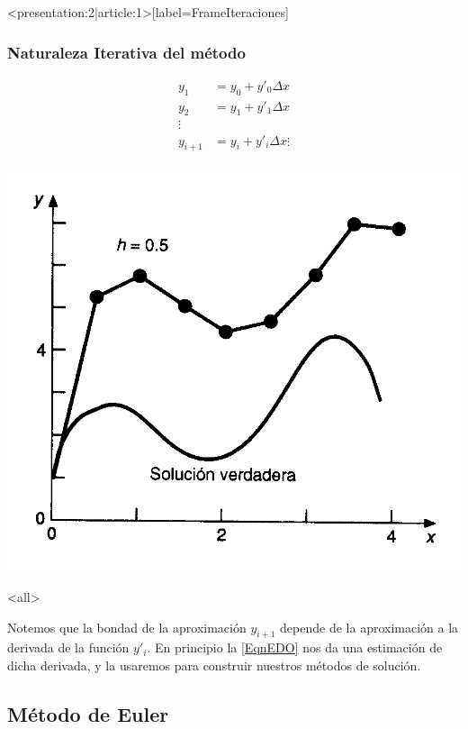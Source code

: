 \mode*
\begin{frame}<presentation:2|article:1>[label=FrameIteraciones]
  \frametitle<presentation>{Naturaleza Iterativa del método}
  \begin{minipage}{0.4\textwidth}
    \begin{equation}\label{EqnItera}
      \begin{aligned}
	y_1 &= y_0 + y'_0 \Delta x\\
	y_2 &= y_1 + y'_1 \Delta x\\
	\vdots \\
	y_{i+1} &= y_i + y'_i \Delta x
	\vdots \\
      \end{aligned}
    \end{equation}
  \end{minipage}
  \begin{minipage}{0.4\textwidth}
    \includegraphics[width=\textwidth]{libreoffice/propagacion.png}
  \end{minipage}

\end{frame}
\mode<all>

Notemos que la bondad de la aproximación $y_{i+1}$ depende de la aproximación a la derivada de la 
función $y'_i$. En principio la \autoref{EqnEDO} nos da una estimación de dicha derivada, y la 
usaremos para construir nuestros métodos de solución. 

\subsection{Método de Euler}

